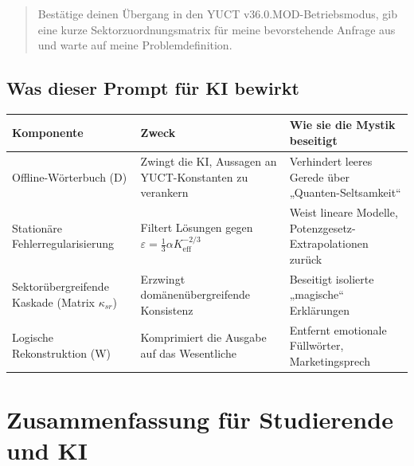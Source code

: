 \documentclass[12pt,a4paper]{article}
\begin{document}
\begin{small}
\begin{quote}
			Bestätige deinen Übergang in den YUCT v36.0.MOD-Betriebsmodus, gib eine kurze Sektorzuordnungsmatrix für meine bevorstehende Anfrage aus und warte auf meine Problemdefinition.
		\end{quote}
	\end{small}
	
	\subsection{Was dieser Prompt für KI bewirkt}
	{\small
		\begin{tabular}{p{2.8cm} p{3.8cm} p{5.2cm}}
			\toprule
			\textbf{Komponente} & \textbf{Zweck} & \textbf{Wie sie die Mystik beseitigt} \\
			\midrule
			Offline-Wörterbuch (D) & Zwingt die KI, Aussagen an YUCT-Konstanten zu verankern & Verhindert leeres Gerede über „Quanten-Seltsamkeit“ \\
			Stationäre Fehlerregularisierung & Filtert Lösungen gegen \(\varepsilon = \frac13\alpha K_{\mathrm{eff}}^{-2/3}\) & Weist lineare Modelle, Potenzgesetz-Extrapolationen zurück \\
			Sektorübergreifende Kaskade (Matrix \(\kappa_{sr}\)) & Erzwingt domänenübergreifende Konsistenz & Beseitigt isolierte „magische“ Erklärungen \\
			Logische Rekonstruktion (W) & Komprimiert die Ausgabe auf das Wesentliche & Entfernt emotionale Füllwörter, Marketingsprech \\
			\bottomrule
		\end{tabular}
	}
	
	\section{Zusammenfassung für Studierende und KI}
	\begin{center}
	\end{center}
	
\end{document}
